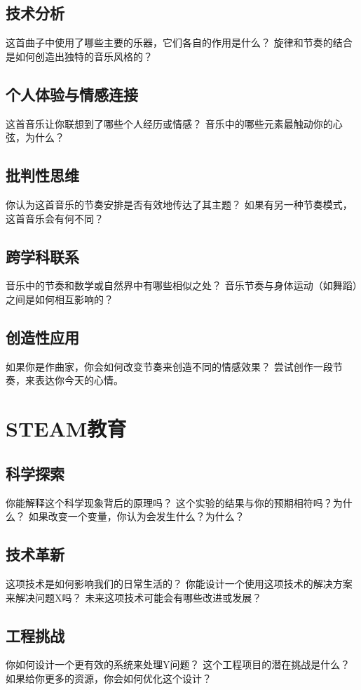\documentclass[12pt]{book}
\begin{document}
\subsection{技术分析}
这首曲子中使用了哪些主要的乐器，它们各自的作用是什么？
旋律和节奏的结合是如何创造出独特的音乐风格的？

\subsection{个人体验与情感连接}
这首音乐让你联想到了哪些个人经历或情感？
音乐中的哪些元素最触动你的心弦，为什么？

\subsection{批判性思维}
你认为这首音乐的节奏安排是否有效地传达了其主题？
如果有另一种节奏模式，这首音乐会有何不同？

\subsection{跨学科联系}
音乐中的节奏和数学或自然界中有哪些相似之处？
音乐节奏与身体运动（如舞蹈）之间是如何相互影响的？

\subsection{创造性应用}
如果你是作曲家，你会如何改变节奏来创造不同的情感效果？
尝试创作一段节奏，来表达你今天的心情。

\section{STEAM教育}
\subsection{科学探索}

你能解释这个科学现象背后的原理吗？
这个实验的结果与你的预期相符吗？为什么？
如果改变一个变量，你认为会发生什么？为什么？

\subsection{技术革新}
这项技术是如何影响我们的日常生活的？
你能设计一个使用这项技术的解决方案来解决问题X吗？
未来这项技术可能会有哪些改进或发展？

\subsection{工程挑战}
你如何设计一个更有效的系统来处理Y问题？
这个工程项目的潜在挑战是什么？
如果给你更多的资源，你会如何优化这个设计？
\end{document}
